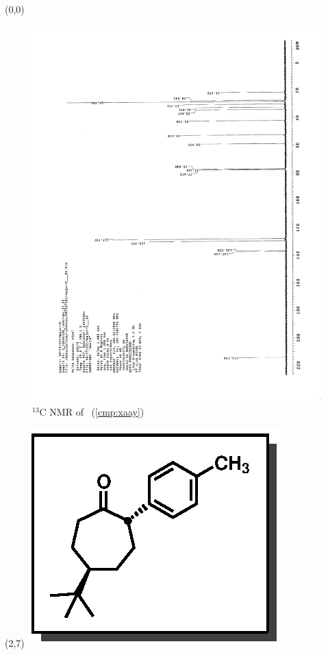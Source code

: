 \clearpage
\begin{textblock}{20}(0,0)
\begin{figure}[htb]
\caption{$^{13}$C NMR of  \CMPxaax\ (\ref{cmp:xaay})}
\includegraphics[scale=0.75, trim = 0mm 0mm 0mm 5mm,
clip]{chp_asymmetric/images/nmr/xaaxC}
\vspace{-100pt}
\end{figure}
\end{textblock}
\begin{textblock}{1}(2,7)
\includegraphics[scale=0.8, angle=90]{chp_asymmetric/images/xaax}
\end{textblock}
\clearpage

